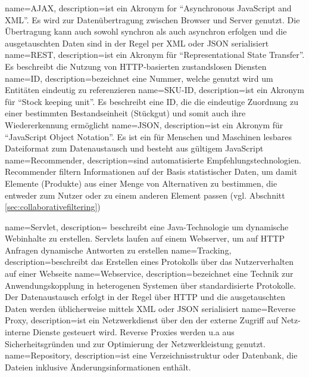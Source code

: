 
{
  name=AJAX,
  description={ist ein Akronym for ``Asynchronous JavaScript and XML''. Es wird zur Datenübertragung zwischen Browser und Server genutzt. Die Übertragung kann auch sowohl synchron als auch asynchron erfolgen und die ausgetauschten Daten sind in der Regel per XML oder JSON serialisiert}
}
{
  name=REST,
  description={ist ein Akronym für ``Representational State Transfer''. Es beschreibt die Nutzung von HTTP-basierten zustandslosen Diensten}
}
{
  name=ID,
  description={bezeichnet eine Nummer, welche genutzt wird um Entitäten eindeutig zu referenzieren}
}
{
  name=SKU-ID,
  description={ist ein Akronym für ``Stock keeping unit''. Es beschreibt eine ID, die die eindeutige Zuordnung zu einer bestimmten Bestandseinheit (Stückgut) und somit auch ihre Wiedererkennung ermöglicht}
}
{
  name=JSON,
  description={ist ein Akronym für ``JavaScript Object Notation''. Es ist ein für Menschen und Maschinen lesbares Dateiformat zum Datenaustausch und besteht aus gültigem JavaScript}
}
{
  name=Recommender,
  description={sind automatisierte Empfehlungstechnologien. Recommender filtern Informationen auf der Basis statistischer Daten, um damit Elemente (Produkte) aus einer Menge von Alternativen zu bestimmen, die entweder zum Nutzer oder zu einem anderen Element passen (vgl. Abschnitt \ref{sec:collaborativefiltering})}
}

{
  name=Servlet,
  description={ beschreibt eine Java-Technologie um dynamische Webinhalte zu erstellen. Servlets laufen auf einem Webserver, um auf HTTP Anfragen dynamische Antworten zu erstellen}
}
{
  name=Tracking,
  description={beschreibt das Erstellen eines Protokolls über das Nutzerverhalten auf einer Webseite}
}
{
  name=Webservice,
  description={bezeichnet eine Technik zur Anwendungskopplung in heterogenen Systemen über standardisierte Protokolle. Der Datenaustausch erfolgt in der Regel über HTTP und die ausgetauschten Daten werden üblicherweise mittels XML oder JSON serialisiert}
}
{
  name=Reverse Proxy,
  description={ist ein Netzwerkdienst über den der externe Zugriff auf Netz-interne Dienste gesteuert wird. Reverse Proxies werden u.a aus Sicherheitsgründen und zur Optimierung der Netzwerkleistung genutzt.}
 }
{
  name=Repository,
  description={ist eine Verzeichnisstruktur oder Datenbank, die Dateien inklusive Änderungsinformationen enthält.}
 } 
 
 
